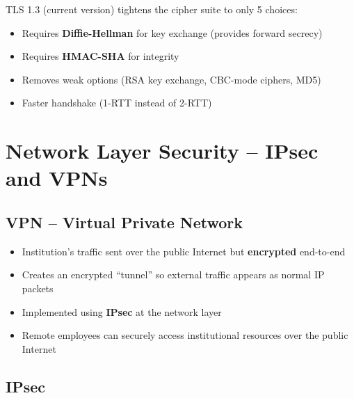 \begin{imagebox}
\end{imagebox}

\begin{tcolorbox}[warnbox, title=TLS 1.3 Changes]
TLS 1.3 (current version) tightens the cipher suite to only 5 choices:
\begin{itemize}[noitemsep]
  \item Requires \textbf{Diffie-Hellman} for key exchange (provides forward secrecy)
  \item Requires \textbf{HMAC-SHA} for integrity
  \item Removes weak options (RSA key exchange, CBC-mode ciphers, MD5)
  \item Faster handshake (1-RTT instead of 2-RTT)
\end{itemize}
\end{tcolorbox}

\section{Network Layer Security -- IPsec and VPNs}

\subsection{VPN -- Virtual Private Network}

\begin{tcolorbox}[keybox, title=VPN]
\begin{itemize}[noitemsep]
  \item Institution's traffic sent over the public Internet but \textbf{encrypted} end-to-end
  \item Creates an encrypted ``tunnel'' so external traffic appears as normal IP packets
  \item Implemented using \textbf{IPsec} at the network layer
  \item Remote employees can securely access institutional resources over the public Internet
\end{itemize}
\end{tcolorbox}

\subsection{IPsec}

